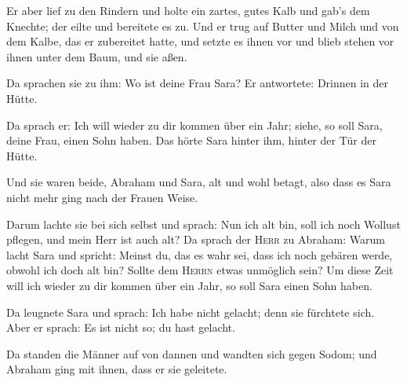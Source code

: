  Er aber lief zu den Rindern und holte ein zartes, gutes
Kalb und gab's dem Knechte; der eilte und bereitete es zu.
 Und er trug auf Butter und Milch und von dem Kalbe, das
er zubereitet hatte, und setzte es ihnen vor und blieb stehen vor ihnen
unter dem Baum, und sie aßen.

 Da sprachen sie zu ihm: Wo ist deine Frau Sara? Er
antwortete: Drinnen in der Hütte.

 Da sprach er: Ich will wieder zu dir kommen über ein
Jahr; siehe, so soll Sara, deine Frau, einen Sohn haben. Das hörte Sara
hinter ihm, hinter der Tür der Hütte.

 Und sie waren beide, Abraham und Sara, alt und wohl
betagt, also dass es Sara nicht mehr ging nach der Frauen Weise.

 Darum lachte sie bei sich selbst und sprach: Nun ich alt
bin, soll ich noch Wollust pflegen, und mein Herr ist auch alt?
 Da sprach der \textsc{Herr} zu Abraham: Warum lacht Sara
und spricht: Meinst du, das es wahr sei, dass ich noch gebären werde,
obwohl ich doch alt bin?  Sollte dem \textsc{Herrn} etwas
unmöglich sein? Um diese Zeit will ich wieder zu dir kommen über ein
Jahr, so soll Sara einen Sohn haben.

 Da leugnete Sara und sprach: Ich habe nicht gelacht;
denn sie fürchtete sich. Aber er sprach: Es ist nicht so; du hast
gelacht.

 Da standen die Männer auf von dannen und wandten sich
gegen Sodom; und Abraham ging mit ihnen, dass er sie geleitete.

